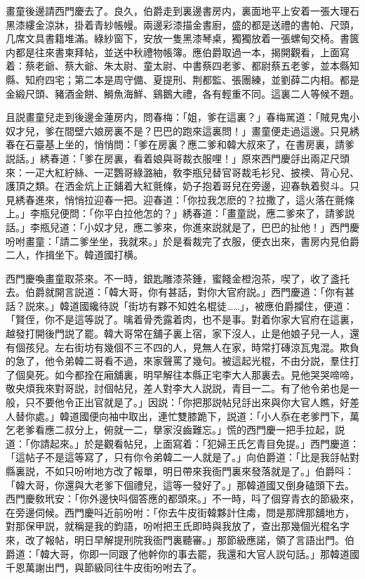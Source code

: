 畫童後邊請西門慶去了。良久，伯爵走到裏邊書房内，裏面地平上安着一張大理石黑漆縷金涼牀，掛着青紗帳幔。兩邊彩漆描金書廚，盛的都是送禮的書帕、尺頭，几席文具書籍堆滿。綠紗窗下，安放一隻黑漆琴桌，獨獨放着一張螺甸交椅。書篋内都是往來書柬拜帖，並送中秋禮物帳簿。應伯爵取過一本，揭開觀看，上面寫着：蔡老爺、蔡大爺、朱太尉、童太尉、中書蔡四老爹、都尉蔡五老爹，並本縣知縣、知府四宅；第二本是周守備、夏提刑、荆都監、張團練，並劉薛二内相。都是金緞尺頭、豬酒金餅、鰣魚海鮮、鷄鵝大禮，各有輕重不同。這裏二人等候不題。

且説畫童兒走到後邊金蓮房内，問春梅：「姐，爹在這裏？」春梅駡道：「賊見鬼小奴才兒，爹在間壁六娘房裏不是？巴巴的跑來這裏問！」畫童便走過這邊。只見綉春在石臺基上坐的，悄悄問：「爹在房裏？應二爹和韓大叔來了，在書房裏，請爹説話。」綉春道：「爹在房裏，看着娘與哥裁衣服哩！」原來西門慶㧱出兩疋尺頭來：一疋大紅紵絲、一疋鸚哥綠潞紬，敎李瓶兒替官哥裁毛衫兒、披襖、背心兒、護頂之類。在洒金炕上正鋪着大紅氈條，奶子抱着哥兒在旁邊，迎春執着熨斗。只見綉春進來，悄悄拉迎春一把。迎春道：「你拉我怎麽的？拉撒了，這火落在氈條上。」李瓶兒便問：「你平白拉他怎的？」綉春道：「畫童説，應二爹來了，請爹説話。」李瓶兒道：「小奴才兒，應二爹來，你進來説就是了，巴巴的扯他！」西門慶吩咐畫童：「請二爹坐坐，我就來。」於是看裁完了衣服，便衣出來，書房内見伯爵二人，作揖坐下。韓道國打横。

西門慶喚畫童取茶來。不一時，銀匙雕漆茶鍾，蜜餞金橙泡茶，喫了，收了盞托去。伯爵就開言説道：「韓大哥，你有甚話，對你大官府説。」西門慶道：「你有甚話？説來。」韓道國纔待説「街坊有夥不知姓名棍徒……」，被應伯爵攔住，便道：「賢侄，你不是這等説了。噙着骨秃露着肉，也不是事。對着你家大官府在這裏，越發打開後門説了罷。韓大哥常在舖子裏上宿，家下沒人，止是他娘子兒一人，還有個孩兒。左右街坊有幾個不三不四的人，見無人在家，時常打磚涼瓦鬼混。欺負的急了，他令弟韓二哥看不過，來家聲罵了幾句。被這起光棍，不由分説，羣住打了個臭死。如今都拴在廂舖裏，明早解往本縣正宅李大人那裏去。見他哭哭啼啼，敬央煩我來對哥説，討個帖兒，差人對李大人説説，青目一二。有了他令弟也是一般，只不要他令正出官就是了。」因説：「你把那説帖兒㧱出來與你大官人瞧，好差人替你處。」韓道國便向袖中取出，連忙雙膝跪下，説道：「小人忝在老爹門下，萬乞老爹看應二叔分上，俯就一二，擧家沒齒難忘。」慌的西門慶一把手拉起，説道：「你請起來。」於是觀看帖兒，上面寫着：「犯婦王氏乞青目免提。」西門慶道：「這帖子不是這等寫了，只有你令弟韓二一人就是了。」向伯爵道：「比是我㧱帖對縣裏説，不如只吩咐地方改了報單，明日帶來我衙門裏來發落就是了。」伯爵呌：「韓大哥，你還與大老爹下個禮兒，這等一發好了。」那韓道國又倒身磕頭下去。西門慶敎玳安：「你外邊快呌個答應的都頭來。」不一時，呌了個穿青衣的節級來，在旁邊伺候。西門慶呌近前吩咐：「你去牛皮街韓夥計住䖏，問是那牌那舖地方，對那保甲説，就稱是我的鈞語，吩咐把王氏即時與我放了，查出那幾個光棍名字來，改了報帖，明日早解提刑院我衙門裏聽審。」那節級應諾，領了言語出門。伯爵道：「韓大哥，你即一同跟了他幹你的事去罷，我還和大官人説句話。」那韓道國千恩萬謝出門，與節級同往牛皮街吩咐去了。

